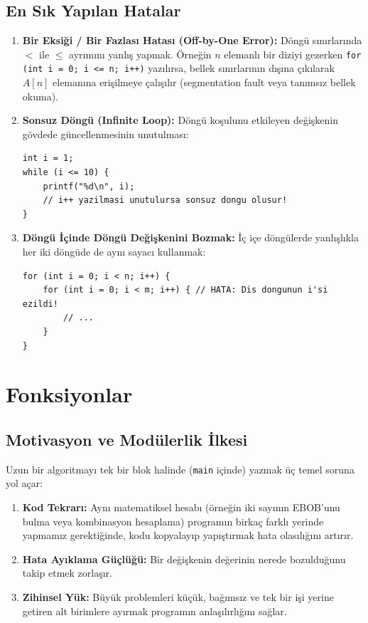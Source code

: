 \subsection{En Sık Yapılan Hatalar}

\begin{enumerate}
    \item \textbf{Bir Eksiği / Bir Fazlası Hatası (Off-by-One Error):} Döngü sınırlarında $<$ ile $\le$ ayrımını yanlış yapmak. Örneğin $n$ elemanlı bir diziyi gezerken \texttt{for (int i = 0; i <= n; i++)} yazılırsa, bellek sınırlarının dışına çıkılarak $A[n]$ elemanına erişilmeye çalışılır (segmentation fault veya tanımsız bellek okuma).
    \item \textbf{Sonsuz Döngü (Infinite Loop):} Döngü koşulunu etkileyen değişkenin gövdede güncellenmesinin unutulması:
\begin{lstlisting}[language=CTemel]
int i = 1;
while (i <= 10) {
    printf("%d\n", i);
    // i++ yazilmasi unutulursa sonsuz dongu olusur!
}
\end{lstlisting}
    \item \textbf{Döngü İçinde Döngü Değişkenini Bozmak:} İç içe döngülerde yanlışlıkla her iki döngüde de aynı sayacı kullanmak:
\begin{lstlisting}[language=CTemel]
for (int i = 0; i < n; i++) {
    for (int i = 0; i < m; i++) { // HATA: Dis dongunun i'si ezildi!
        // ...
    }
}
\end{lstlisting}
\end{enumerate}

\section{Fonksiyonlar}

\subsection{Motivasyon ve Modülerlik İlkesi}

Uzun bir algoritmayı tek bir blok halinde (\texttt{main} içinde) yazmak üç temel soruna yol açar:
\begin{enumerate}
    \item \textbf{Kod Tekrarı:} Aynı matematiksel hesabı (örneğin iki sayının EBOB'unu bulma veya kombinasyon hesaplama) programın birkaç farklı yerinde yapmamız gerektiğinde, kodu kopyalayıp yapıştırmak hata olasılığını artırır.
    \item \textbf{Hata Ayıklama Güçlüğü:} Bir değişkenin değerinin nerede bozulduğunu takip etmek zorlaşır.
    \item \textbf{Zihinsel Yük:} Büyük problemleri küçük, bağımsız ve tek bir işi yerine getiren alt birimlere ayırmak programın anlaşılırlığını sağlar.
\end{enumerate}


